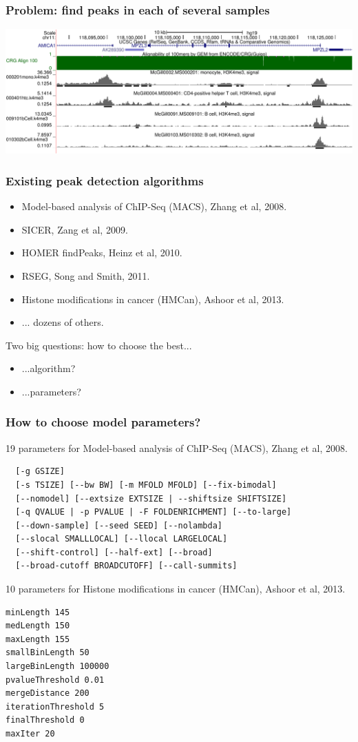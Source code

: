 \documentclass{beamer}
\begin{document}
\begin{frame}
  \frametitle{Problem: find peaks in each of several samples}
  \includegraphics[width=\textwidth]{screenshot-ucsc-edited}
\end{frame}

\begin{frame}
  \frametitle{Existing peak detection algorithms}
  \begin{itemize}
  \item Model-based analysis of ChIP-Seq (MACS), Zhang et al, 2008.
  \item SICER, Zang et al, 2009.
  \item HOMER findPeaks, Heinz et al, 2010.
  \item RSEG, Song and Smith, 2011.
  \item Histone modifications in cancer (HMCan), Ashoor et al, 2013.
  \item ... dozens of others.
  \end{itemize}
  Two big questions: how to choose the best...
  \begin{itemize}
  \item ...algorithm?
  \item ...parameters?
  \end{itemize}
\end{frame}

\begin{frame}[fragile]
  \frametitle{How to choose model parameters?}
\scriptsize
19 parameters for Model-based analysis of ChIP-Seq (MACS), Zhang et al, 2008.
\begin{verbatim}
  [-g GSIZE]
  [-s TSIZE] [--bw BW] [-m MFOLD MFOLD] [--fix-bimodal]
  [--nomodel] [--extsize EXTSIZE | --shiftsize SHIFTSIZE]
  [-q QVALUE | -p PVALUE | -F FOLDENRICHMENT] [--to-large]
  [--down-sample] [--seed SEED] [--nolambda]
  [--slocal SMALLLOCAL] [--llocal LARGELOCAL]
  [--shift-control] [--half-ext] [--broad]
  [--broad-cutoff BROADCUTOFF] [--call-summits]
\end{verbatim}
10 parameters for Histone modifications in cancer (HMCan),
Ashoor et al, 2013.
\begin{verbatim}
minLength 145
medLength 150
maxLength 155
smallBinLength 50
largeBinLength 100000
pvalueThreshold 0.01
mergeDistance 200
iterationThreshold 5
finalThreshold 0
maxIter 20
\end{verbatim}
\end{frame}
\end{document}
